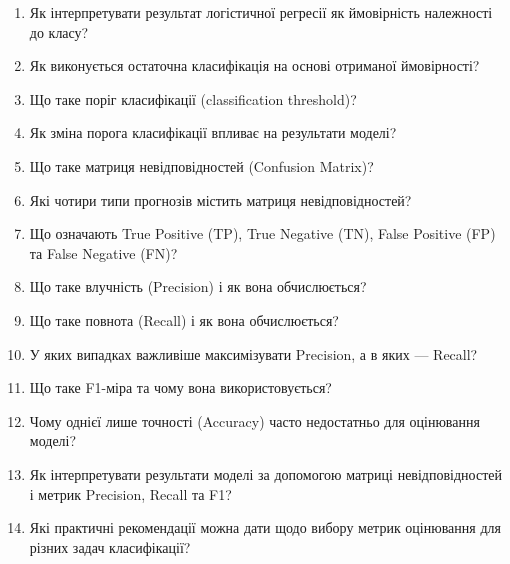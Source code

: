 \begin{enumerate}
\item Як інтерпретувати результат логістичної регресії як ймовірність належності до класу?
\item Як виконується остаточна класифікація на основі отриманої ймовірності?
\item Що таке поріг класифікації (classification threshold)?
\item Як зміна порога класифікації впливає на результати моделі?
\item Що таке матриця невідповідностей (Confusion Matrix)?
\item Які чотири типи прогнозів містить матриця невідповідностей?
\item Що означають True Positive (TP), True Negative (TN), False Positive (FP) та False Negative (FN)?
\item Що таке влучність (Precision) і як вона обчислюється?
\item Що таке повнота (Recall) і як вона обчислюється?
\item У яких випадках важливіше максимізувати Precision, а в яких — Recall?
\item Що таке F1-міра та чому вона використовується?
\item Чому однієї лише точності (Accuracy) часто недостатньо для оцінювання моделі?
\item Як інтерпретувати результати моделі за допомогою матриці невідповідностей і метрик Precision, Recall та F1?
\item Які практичні рекомендації можна дати щодо вибору метрик оцінювання для різних задач класифікації?
\end{enumerate}
